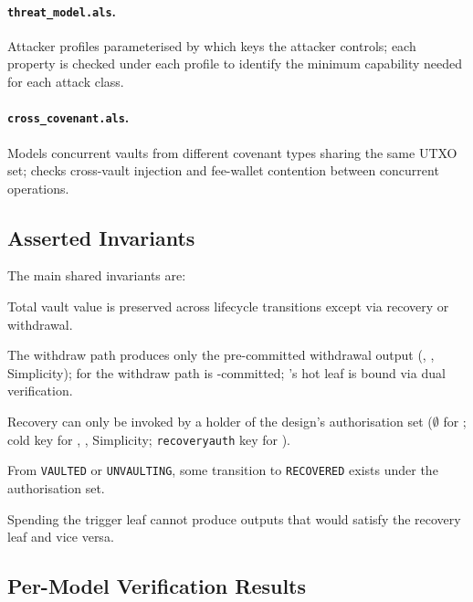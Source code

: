 \paragraph{\texttt{threat\_model.als}.}
Attacker profiles parameterised by which keys the attacker
controls; each property is checked under each profile to identify
the minimum capability needed for each attack class.

\paragraph{\texttt{cross\_covenant.als}.}
Models concurrent vaults from different covenant types sharing the
same UTXO set; checks cross-vault injection and fee-wallet
contention between concurrent \opvault{} operations.

\subsection{Asserted Invariants}
\label{app:alloy:invariants}

The main shared invariants are:

\begin{description}[leftmargin=1.4em,itemsep=1pt,parsep=0pt,topsep=2pt]
  \item[Fund conservation.] Total vault value is preserved across
    lifecycle transitions except via recovery or withdrawal.
  \item[Destination binding.] The withdraw path produces only the
    pre-committed withdrawal output (\opctv{}, \opvault{}, Simplicity);
    for \opccv{} the withdraw path is \opctv{}-committed; \catcsfs{}'s hot
    leaf is bound via dual verification.
  \item[Recovery authorisation.] Recovery can only be invoked by a
    holder of the design's authorisation set
    ($\emptyset$ for \opccv{}; cold key for \opctv{}, \catcsfs{}, Simplicity;
    \texttt{recoveryauth} key for \opvault{}).
  \item[Recovery liveness.] From \texttt{VAULTED} or
    \texttt{UNVAULTING}, some transition to \texttt{RECOVERED}
    exists under the authorisation set.
  \item[No cross-leaf extraction.] Spending the trigger leaf
    cannot produce outputs that would satisfy the recovery leaf
    and vice versa.
\end{description}

\subsection{Per-Model Verification Results}

